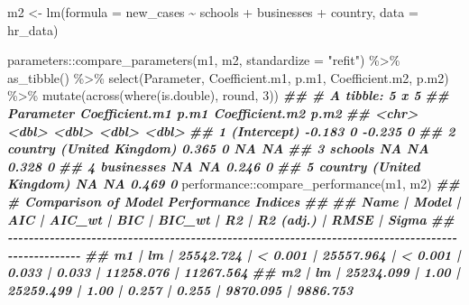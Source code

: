\documentclass[
]{book}
\newenvironment{Shaded}{\begin{snugshade}}{\end{snugshade}}
\newcommand{\AttributeTok}[1]{\textcolor[rgb]{0.77,0.63,0.00}{#1}}
\newcommand{\DecValTok}[1]{\textcolor[rgb]{0.00,0.00,0.81}{#1}}
\newcommand{\DocumentationTok}[1]{\textcolor[rgb]{0.56,0.35,0.01}{\textbf{\textit{#1}}}}
\newcommand{\FunctionTok}[1]{\textcolor[rgb]{0.00,0.00,0.00}{#1}}
\newcommand{\NormalTok}[1]{#1}
\newcommand{\OtherTok}[1]{\textcolor[rgb]{0.56,0.35,0.01}{#1}}
\newcommand{\SpecialCharTok}[1]{\textcolor[rgb]{0.00,0.00,0.00}{#1}}
\newcommand{\StringTok}[1]{\textcolor[rgb]{0.31,0.60,0.02}{#1}}
\begin{document}
\begin{Shaded}
\begin{Highlighting}[]
\NormalTok{m2 }\OtherTok{\textless{}{-}} \FunctionTok{lm}\NormalTok{(}\AttributeTok{formula =}\NormalTok{ new\_cases }\SpecialCharTok{\textasciitilde{}}
\NormalTok{           schools }\SpecialCharTok{+}
\NormalTok{           businesses }\SpecialCharTok{+}
\NormalTok{           country,}
         \AttributeTok{data =}\NormalTok{ hr\_data)}

\NormalTok{parameters}\SpecialCharTok{::}\FunctionTok{compare\_parameters}\NormalTok{(m1, m2, }\AttributeTok{standardize =} \StringTok{"refit"}\NormalTok{) }\SpecialCharTok{\%\textgreater{}\%}
  \FunctionTok{as\_tibble}\NormalTok{() }\SpecialCharTok{\%\textgreater{}\%}
  \FunctionTok{select}\NormalTok{(Parameter, Coefficient.m1, p.m1, Coefficient.m2, p.m2) }\SpecialCharTok{\%\textgreater{}\%}
  \FunctionTok{mutate}\NormalTok{(}\FunctionTok{across}\NormalTok{(}\FunctionTok{where}\NormalTok{(is.double), round, }\DecValTok{3}\NormalTok{))}
\DocumentationTok{\#\# \# A tibble: 5 x 5}
\DocumentationTok{\#\#   Parameter                Coefficient.m1  p.m1 Coefficient.m2  p.m2}
\DocumentationTok{\#\#   \textless{}chr\textgreater{}                             \textless{}dbl\textgreater{} \textless{}dbl\textgreater{}          \textless{}dbl\textgreater{} \textless{}dbl\textgreater{}}
\DocumentationTok{\#\# 1 (Intercept)                      {-}0.183     0         {-}0.235     0}
\DocumentationTok{\#\# 2 country (United Kingdom)          0.365     0         NA        NA}
\DocumentationTok{\#\# 3 schools                          NA        NA          0.328     0}
\DocumentationTok{\#\# 4 businesses                       NA        NA          0.246     0}
\DocumentationTok{\#\# 5 country (United Kingdom)         NA        NA          0.469     0}
\NormalTok{performance}\SpecialCharTok{::}\FunctionTok{compare\_performance}\NormalTok{(m1, m2)}
\DocumentationTok{\#\# \# Comparison of Model Performance Indices}
\DocumentationTok{\#\# }
\DocumentationTok{\#\# Name | Model |       AIC |  AIC\_wt |       BIC |  BIC\_wt |    R2 | R2 (adj.) |      RMSE |     Sigma}
\DocumentationTok{\#\# {-}{-}{-}{-}{-}{-}{-}{-}{-}{-}{-}{-}{-}{-}{-}{-}{-}{-}{-}{-}{-}{-}{-}{-}{-}{-}{-}{-}{-}{-}{-}{-}{-}{-}{-}{-}{-}{-}{-}{-}{-}{-}{-}{-}{-}{-}{-}{-}{-}{-}{-}{-}{-}{-}{-}{-}{-}{-}{-}{-}{-}{-}{-}{-}{-}{-}{-}{-}{-}{-}{-}{-}{-}{-}{-}{-}{-}{-}{-}{-}{-}{-}{-}{-}{-}{-}{-}{-}{-}{-}{-}{-}{-}{-}{-}{-}{-}{-}{-}{-}}
\DocumentationTok{\#\# m1   |    lm | 25542.724 | \textless{} 0.001 | 25557.964 | \textless{} 0.001 | 0.033 |     0.033 | 11258.076 | 11267.564}
\DocumentationTok{\#\# m2   |    lm | 25234.099 |    1.00 | 25259.499 |    1.00 | 0.257 |     0.255 |  9870.095 |  9886.753}
\end{Highlighting}
\end{Shaded}
\end{document}

